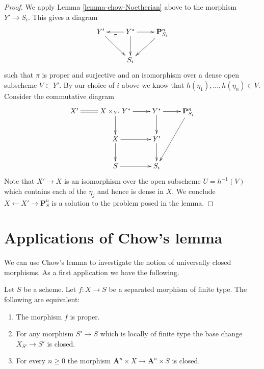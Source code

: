 \begin{proof}
\medskip\noindent
We apply Lemma \ref{lemma-chow-Noetherian} above to the morphism
$Y' \to S_i$. This gives a diagram
$$
\xymatrix{
Y' \ar[rd] & Y^* \ar[d] \ar[l]^\pi \ar[r] & \mathbf{P}^n_{S_i} \ar[dl] \\
& S_i &
}
$$
such that $\pi$ is proper and surjective and an isomorphism over
a dense open subscheme $V \subset Y'$. By our choice of $i$ above
we know that $h(\eta_1), \ldots, h(\eta_n) \in V$. Consider
the commutative diagram
$$
\xymatrix{
X' \ar@{=}[r] &
X \times_{Y'} Y^* \ar[r] \ar[d] &
Y^* \ar[r] \ar[d] &
\mathbf{P}^n_{S_i} \ar[ddl] \\
& X \ar[r] \ar[d] & Y' \ar[d] & \\
& S \ar[r] & S_i &
}
$$
Note that $X' \to X$ is an isomorphism over the open subscheme
$U = h^{-1}(V)$ which contains each of the $\eta_j$ and hence is
dense in $X$. We conclude $X \leftarrow X' \rightarrow \mathbf{P}^n_S$
is a solution to the problem posed in the lemma.
\end{proof}













\section{Applications of Chow's lemma}
\label{section-apply-chow}

\noindent
We can use Chow's lemma to investigate the notion of universally closed
morphisms. As a first application we have the following.

\begin{lemma}
\label{lemma-limited-base-change}
Let $S$ be a scheme.
Let $f : X \to S$ be a separated morphism of finite type.
The following are equivalent:
\begin{enumerate}
\item The morphism $f$ is proper.
\item For any morphism $S' \to S$ which is locally of finite type
the base change $X_{S'} \to S'$ is closed.
\item For every $n \geq 0$ the morphism
$\mathbf{A}^n \times X \to \mathbf{A}^n \times S$ is closed.
\end{enumerate}
\end{lemma}

